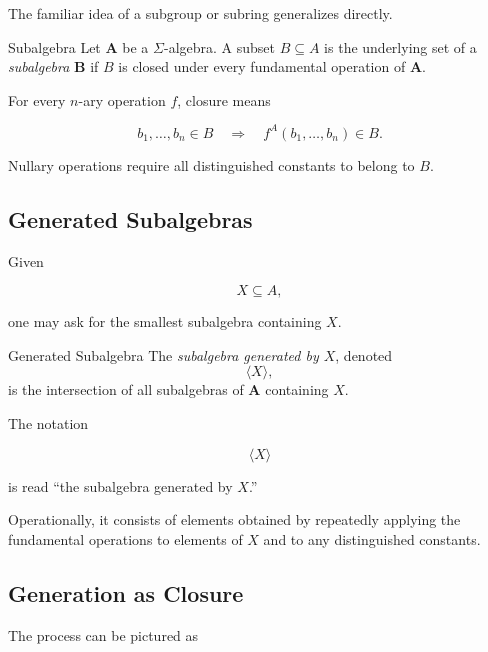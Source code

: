 The familiar idea of a subgroup or subring generalizes directly.

\begin{definitionbox}{Subalgebra}
Let \(\mathbf A\) be a \(\Sigma\)-algebra. A subset \(B\subseteq A\) is the
underlying set of a \emph{subalgebra} \(\mathbf B\) if \(B\) is closed under
every fundamental operation of \(\mathbf A\).
\end{definitionbox}

For every \(n\)-ary operation \(f\), closure means

\[ b_1,\ldots,b_n\in B
\quad\Longrightarrow\quad
f^A(b_1,\ldots,b_n)\in B. \]

Nullary operations require all distinguished constants to belong to \(B\).

\subsection{Generated Subalgebras}
\label{subsec:generated-subalgebras}

Given

\[ X\subseteq A, \]

one may ask for the smallest subalgebra containing \(X\).

\begin{definitionbox}{Generated Subalgebra}
The \emph{subalgebra generated by \(X\)}, denoted
\[ \langle X\rangle, \]
is the intersection of all subalgebras of \(\mathbf A\) containing \(X\).
\end{definitionbox}

The notation

\[ \langle X\rangle \]

is read ``the subalgebra generated by \(X\).''

Operationally, it consists of elements obtained by repeatedly applying the
fundamental operations to elements of \(X\) and to any distinguished
constants.

\subsection{Generation as Closure}
\label{subsec:generation-closure}

The process can be pictured as

